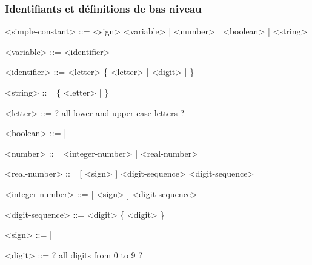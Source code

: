 \documentclass[french]{article}
\begin{document}
	\subsubsection{Identifiants et définitions de bas niveau}
	\begin{grammar}
		<simple-constant> ::= <sign> <variable> | <number> | <boolean> | <string>
		
		<variable> ::= <identifier>
		
		<identifier> ::= <letter> \{ <letter> | <digit> | \lit{\_} \}
		
		<string> ::=  \{ <letter> | \lit{ } \} 
		
		<letter> ::= ? all lower and upper case letters ? 
		
		<boolean> ::=  | 
		
		<number> ::= <integer-number> | <real-number>
		
		<real-number> ::= [ <sign> ] <digit-sequence>  <digit-sequence>
		
		<integer-number> ::= [ <sign> ] <digit-sequence>
		
		<digit-sequence> ::= <digit> \{ <digit> \}
		
		<sign> ::= \lit{+} | \lit{-} 
		
		<digit> ::= ? all digits from 0 to 9 ? 
	\end{grammar}
	
\end{document}
